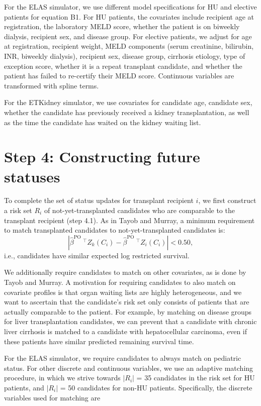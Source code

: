 \documentclass[11pt,twoside,]{book}
\begin{document}
For the ELAS simulator, we use different model specifications for HU
and elective patients for equation B1. For HU patients, the covariates
include recipient age at registration, the laboratory MELD score, whether the
patient is on biweekly dialysis, recipient sex, and disease group. For
elective patients, we adjust for age at registration, recipient weight,
MELD components (serum creatinine, bilirubin, INR, biweekly dialysis),
recipient sex, disease group, cirrhosis etiology, type of exception
score, whether it is a repeat transplant candidate, and whether the patient
has failed to re-certify their MELD score. Continuous variables are
transformed with spline terms.

For the ETKidney simulator, we use covariates for candidate age, candidate sex,
whether the candidate has previously received a kidney transplantation,
as well as the time the candidate has waited on the kidney waiting list.

\newpage

\section{Step 4: Constructing future statuses}\label{step-4-constructing-future-statuses}

To complete the set of status updates for transplant recipient \(i\),
we first construct a risk set \(R_i\) of not-yet-transplanted candidates who
are comparable to the transplant recipient (step 4.1).
As in Tayob and Murray, a minimum requirement to match transplanted
candidates to not-yet-transplanted candidates is:
\[|\hat{\beta}^{\text{PO}}\ ^\intercal Z_k(C_{i}) - \hat{\beta}^{\text{PO}}\ ^\intercal Z_i(C_{i})| < 0.50,\]
i.e., candidates have similar expected log restricted survival.

We additionally require candidates to match on other covariates,
as is done by Tayob and Murray. A motivation for requiring candidates to
also match on covariate profiles is that organ waiting lists are highly
heterogeneous, and we want to ascertain that the candidate's risk set
only consists of patients that are actually comparable to the patient. For example, by matching on disease groups for
liver transplantation candidates, we can prevent that a candidate
with chronic liver cirrhosis is matched to a candidate with hepatocellular
carcinoma, even if these patients have similar predicted remaining
survival time.

For the ELAS simulator, we require candidates to always match on pediatric status. For other discrete and continuous variables, we use an adaptive matching procedure,
in which we strive towards \(|R_i|\) = 35 candidates in the risk set for HU patients, and \(|R_i|\) = 50
candidates for non-HU patients. Specifically, the discrete variables used for matching are
\end{document}
